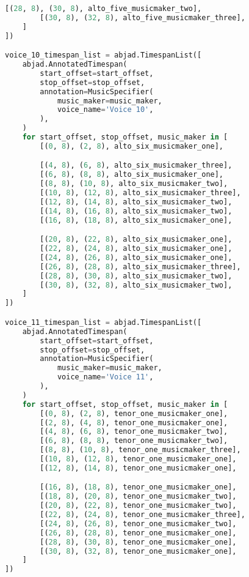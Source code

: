 \begin{lstlisting}[language=Python, caption=Invocation Source Code]
        [(28, 8), (30, 8), alto_five_musicmaker_two],
        [(30, 8), (32, 8), alto_five_musicmaker_three],
    ]
])

voice_10_timespan_list = abjad.TimespanList([
    abjad.AnnotatedTimespan(
        start_offset=start_offset,
        stop_offset=stop_offset,
        annotation=MusicSpecifier(
            music_maker=music_maker,
            voice_name='Voice 10',
        ),
    )
    for start_offset, stop_offset, music_maker in [
        [(0, 8), (2, 8), alto_six_musicmaker_one],

        [(4, 8), (6, 8), alto_six_musicmaker_three],
        [(6, 8), (8, 8), alto_six_musicmaker_one],
        [(8, 8), (10, 8), alto_six_musicmaker_two],
        [(10, 8), (12, 8), alto_six_musicmaker_three],
        [(12, 8), (14, 8), alto_six_musicmaker_two],
        [(14, 8), (16, 8), alto_six_musicmaker_two],
        [(16, 8), (18, 8), alto_six_musicmaker_one],

        [(20, 8), (22, 8), alto_six_musicmaker_one],
        [(22, 8), (24, 8), alto_six_musicmaker_one],
        [(24, 8), (26, 8), alto_six_musicmaker_one],
        [(26, 8), (28, 8), alto_six_musicmaker_three],
        [(28, 8), (30, 8), alto_six_musicmaker_two],
        [(30, 8), (32, 8), alto_six_musicmaker_two],
    ]
])

voice_11_timespan_list = abjad.TimespanList([
    abjad.AnnotatedTimespan(
        start_offset=start_offset,
        stop_offset=stop_offset,
        annotation=MusicSpecifier(
            music_maker=music_maker,
            voice_name='Voice 11',
        ),
    )
    for start_offset, stop_offset, music_maker in [
        [(0, 8), (2, 8), tenor_one_musicmaker_one],
        [(2, 8), (4, 8), tenor_one_musicmaker_one],
        [(4, 8), (6, 8), tenor_one_musicmaker_two],
        [(6, 8), (8, 8), tenor_one_musicmaker_two],
        [(8, 8), (10, 8), tenor_one_musicmaker_three],
        [(10, 8), (12, 8), tenor_one_musicmaker_one],
        [(12, 8), (14, 8), tenor_one_musicmaker_one],

        [(16, 8), (18, 8), tenor_one_musicmaker_one],
        [(18, 8), (20, 8), tenor_one_musicmaker_two],
        [(20, 8), (22, 8), tenor_one_musicmaker_two],
        [(22, 8), (24, 8), tenor_one_musicmaker_three],
        [(24, 8), (26, 8), tenor_one_musicmaker_two],
        [(26, 8), (28, 8), tenor_one_musicmaker_one],
        [(28, 8), (30, 8), tenor_one_musicmaker_one],
        [(30, 8), (32, 8), tenor_one_musicmaker_one],
    ]
])


\end{lstlisting}
